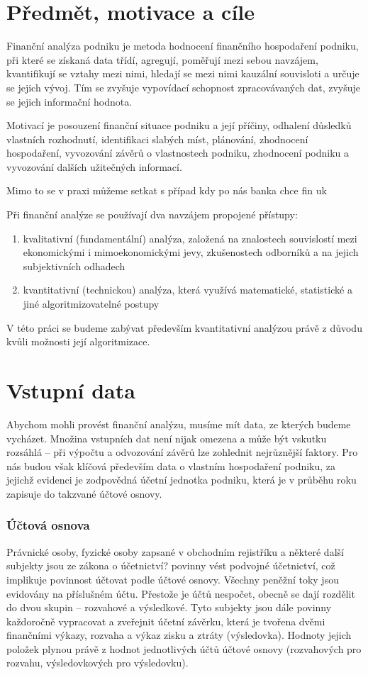 \section{Předmět, motivace a cíle}
Finanční analýza podniku je metoda hodnocení finančního hospodaření podniku, při které se získaná data třídí, agregují, poměřují mezi sebou navzájem, kvantifikují se vztahy mezi nimi, hledají se mezi nimi kauzální souvisloti a určuje se jejich vývoj. Tím se zvyšuje vypovídací schopnost zpracovávaných dat, zvyšuje se jejich informační hodnota\cite{sedl}.

Motivací je posouzení finanční situace podniku a její příčiny, odhalení důsledků vlastních rozhodnutí, identifikaci slabých míst, plánování, zhodnocení hospodaření, vyvozování závěrů o vlastnostech podniku, zhodnocení podniku a vyvozování dalších užitečných informací.

Mimo to se v praxi můžeme setkat s případ kdy po nás banka chce fin uk

Při finanční analýze se používají dva navzájem propojené přístupy\cite{kova}:
\begin{enumerate}
	\item kvalitativní (fundamentální) analýza, založená na znalostech souvislostí mezi ekonomickými i mimoekonomickými jevy, zkušenostech odborníků a na jejich subjektivních odhadech
	\item kvantitativní (technickou) analýza, která využívá matematické, statistické a jiné algoritmizovatelné postupy
\end{enumerate}
V této práci se budeme zabývat především kvantitativní analýzou právě z důvodu kvůli možnosti její algoritmizace.

\section{Vstupní data}
Abychom mohli provést finanční analýzu, musíme mít data, ze kterých budeme vycházet. Množina vstupních dat není nijak omezena a může být vskutku rozsáhlá -- při výpočtu a odvozování závěrů lze zohlednit nejrůznější faktory. Pro nás budou však klíčová především data o vlastním hospodaření podniku, za jejichž evidenci je zodpovědná účetní jednotka podniku, která je v průběhu roku zapisuje do takzvané účtové osnovy.

\subsubsection{Účtová osnova}
Právnické osoby, fyzické osoby zapsané v obchodním rejistříku a některé další subjekty jsou ze zákona o účetnictví? povinny vést podvojné účetnictví, což implikuje povinnost účtovat podle účtové osnovy.
Všechny peněžní toky jsou evidovány na příslušném účtu. Přestože je účtů nespočet, obecně se dají rozdělit do dvou skupin -- rozvahové a výsledkové. Tyto subjekty jsou dále povinny každoročně vypracovat a zveřejnit účetní závěrku, která je tvořena dvěmi finančními výkazy, rozvaha a výkaz zisku a ztráty (výsledovka).
Hodnoty jejich položek plynou právě z hodnot jednotlivých účtů účtové osnovy (rozvahových pro rozvahu, výsledovkových pro výsledovku).

